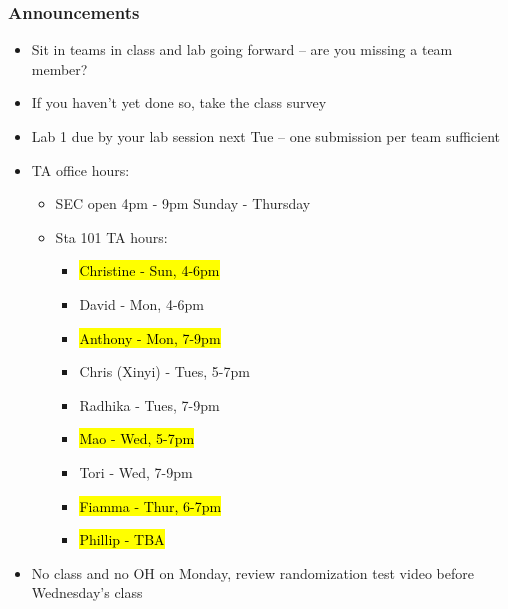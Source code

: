 \documentclass[slidestop,compress,mathserif,12pt,t,professionalfonts,xcolor=table]{beamer}
\begin{document}
\begin{frame}
\frametitle{Announcements}

\begin{itemize}

\item Sit in teams in class and lab going forward -- are you missing a team member?

\item If you haven't yet done so, take the class survey

\item Lab 1 due by your lab session next Tue -- one submission per team sufficient


\item TA office hours:
\begin{itemize}

\item SEC open 4pm - 9pm Sunday - Thursday

\item Sta 101 TA hours:
\vspace{-0.25cm}
\begin{multicols}{2}
\begin{itemize}
\item \hl{Christine - Sun, 4-6pm}
\item David - Mon, 4-6pm
\item \hl{Anthony - Mon, 7-9pm}
\item Chris (Xinyi) - Tues, 5-7pm
\item Radhika - Tues, 7-9pm
\item \hl{Mao - Wed, 5-7pm}
\item Tori - Wed, 7-9pm
\item \hl{Fiamma - Thur, 6-7pm}
\item \hl{Phillip - TBA}
\end{itemize}
\end{multicols}
\vspace{-0.25cm}
\end{itemize}

\item No class and no OH on Monday, review randomization test video before Wednesday's class


\end{itemize}
\end{frame}
\end{document}
